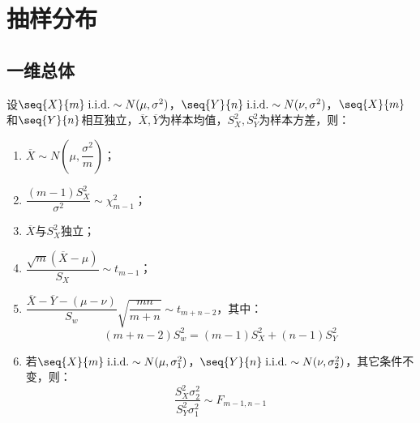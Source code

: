 \section{抽样分布}

\subsection{一维总体}
\begin{theorem}
	设$\seq{X}{m}\;\text{i.i.d.}\sim N(\mu,\sigma^2)$，$\seq{Y}{n}\;\text{i.i.d.}\sim N(\nu,\sigma^2)$，$\seq{X}{m}$和$\seq{Y}{n}$相互独立，$\overline{X},\overline{Y}$为样本均值，$S_X^2,S_Y^2$为样本方差，则：
	\begin{enumerate}
		\item $\overline{X}\sim N\left(\mu,\dfrac{\sigma^2}{m}\right)$；
		\item $\dfrac{(m-1)S_X^2}{\sigma^2}\sim\chi_{m-1}^2$；
		\item $\overline{X}$与$S_X^2$独立；
		\item $\dfrac{\sqrt{m}(\overline{X}-\mu)}{S_X}\sim t_{m-1}$；
		\item $\dfrac{\overline{X}-\overline{Y}-(\mu-\nu)}{S_w}\sqrt{\dfrac{mn}{m+n}}\sim t_{m+n-2}$，其中：
		\begin{equation*}
			(m+n-2)S_w^2=(m-1)S_X^2+(n-1)S_Y^2
		\end{equation*}
		\item 若$\seq{X}{m}\;\text{i.i.d.}\sim N(\mu,\sigma_1^2)$，$\seq{Y}{n}\;\text{i.i.d.}\sim N(\nu,\sigma_2^2)$，其它条件不变，则：
		\begin{equation*}
			\frac{S_X^2\sigma_2^2}{S_Y^2\sigma_1^2}\sim F_{m-1,n-1}
		\end{equation*}
	\end{enumerate}
\end{theorem}
